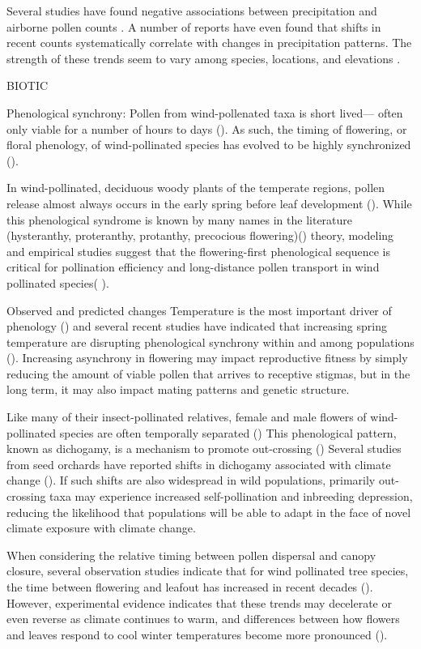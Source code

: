 \documentclass[12pt]{article}
\begin{document}
Several studies have found negative associations between precipitation and airborne pollen counts \citep{Grewling:2014aa,Gross2019,Pace:2018aa}. A number of reports have even found that shifts in recent counts systematically correlate with changes in precipitation patterns\citep{Zhang:2015, Bruffaerts:2018aa}. The strength of these trends seem to vary among species, locations, and elevations 
\citep{Knaap:2010aa,Pace:2018aa}.

BIOTIC

Phenological synchrony: Pollen from wind-pollenated taxa is short lived--- often only viable for a number of hours to days (). As such, the timing of flowering, or floral phenology, of wind-pollinated species has evolved to be highly synchronized ().

In wind-pollinated, deciduous woody plants of the temperate regions, pollen release almost always occurs in the early spring before leaf development (). While this phenological syndrome is known by many names in the literature (hysteranthy, proteranthy, protanthy, precocious flowering)() theory, modeling and empirical studies suggest that the flowering-first phenological sequence is critical for pollination efficiency and long-distance pollen transport in wind pollinated species( ).

Observed and predicted changes
Temperature is the most important driver of phenology () and several recent studies have indicated that increasing spring temperature are disrupting phenological synchrony within and among populations (). Increasing asynchrony in flowering may impact reproductive fitness by simply reducing the amount of viable pollen that arrives to receptive stigmas, but in the long term, it may also impact mating patterns and genetic structure. 

Like many of their insect-pollinated relatives, female and male flowers of wind-pollinated species are often temporally separated () This phenological pattern, known as dichogamy, is a mechanism to promote out-crossing () Several studies from seed orchards have reported shifts in dichogamy associated with climate change (). If such shifts are also widespread in wild populations, primarily out-crossing taxa may experience increased self-pollination and inbreeding depression, reducing the likelihood that populations will be able to adapt in the face of novel climate exposure with climate change.

When considering the relative timing between pollen dispersal and canopy closure, several observation studies indicate that for wind pollinated tree species, the time between flowering and leafout has increased in recent decades (). However, experimental evidence indicates that these trends may decelerate or even reverse as climate continues to warm, and differences between how flowers and leaves respond to cool winter temperatures become more pronounced (). 
\end{document}
